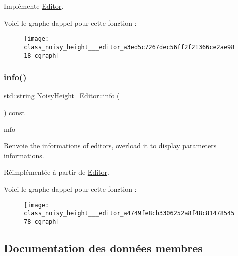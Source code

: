 Implémente \hyperlink{class_editor_abca97ba11536c494a0c26bac77917792}{Editor}.

Voici le graphe d\textquotesingle{}appel pour cette fonction \+:\nopagebreak
\begin{figure}[H]
\begin{center}
\leavevmode
\texttt{[image: class\_noisy\_height\_\_\_editor\_a3ed5c7267dec56ff2f21366ce2ae9818\_cgraph]}
\end{center}
\end{figure}
\mbox{\label{class_noisy_height___editor_a4749fe8cb3306252a8f48c8147854578}} 
\subsubsection{\texorpdfstring{info()}{info()}}
{\footnotesize\ttfamily std\+::string Noisy\+Height\+\_\+\+Editor\+::info (\begin{DoxyParamCaption}{ }\end{DoxyParamCaption}) const\hspace{0.3cm}{\ttfamily [virtual]}}



info 

\begin{DoxyReturn}{Renvoie}
the informations of editors, overload it to display parameters informations. 
\end{DoxyReturn}


Réimplémentée à partir de \hyperlink{class_editor_a5747cd74b71d67f6d39b094071058382}{Editor}.

Voici le graphe d\textquotesingle{}appel pour cette fonction \+:\nopagebreak
\begin{figure}[H]
\begin{center}
\leavevmode
\texttt{[image: class\_noisy\_height\_\_\_editor\_a4749fe8cb3306252a8f48c8147854578\_cgraph]}
\end{center}
\end{figure}


\subsection{Documentation des données membres}
\mbox{\label{class_noisy_height___editor_ac6b90169942b0bb92d6461dbf9a2e000}} 

